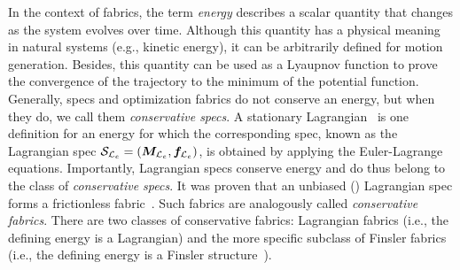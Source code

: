 In the context of \ac{fabrics}, the term \textit{energy} describes a scalar quantity that
changes as the system evolves over time.  Although this quantity has a physical meaning in
natural systems (e.g., kinetic energy), it can be arbitrarily defined for motion generation.
Besides, this quantity can be used as
a Lyaupnov function to prove the convergence of the trajectory to the minimum of the potential
function.
Generally, specs and optimization fabrics do not conserve an energy, but when they do, we
call them \textit{conservative specs}.  A stationary Lagrangian~\cite[Definition
4.11]{Ratliff2020} is one definition for an energy for which the corresponding spec, known
as the Lagrangian spec $\mathcal{S}_{\mathcal{L}_e} = \left(\bm{M}_{\mathcal{L}_e},\bm{f}_{\mathcal{L}_e}\right)$, is obtained by applying the
Euler-Lagrange equations. Importantly, Lagrangian specs conserve energy and do thus belong
to the class of \textit{conservative specs}.  It was proven that an unbiased
(\cite[Definition~4.11]{Ratliff2020}) Lagrangian spec forms a frictionless
fabric~\cite[Proposition~4.18]{Ratliff2020}. Such fabrics are analogously called
\textit{conservative fabrics}.  There are two classes of conservative fabrics: Lagrangian
fabrics (i.e., the defining energy is a Lagrangian) and the more specific subclass of
Finsler fabrics (i.e., the
defining energy is a Finsler structure~\cite[Definition 5.4]{Ratliff2020}). 

